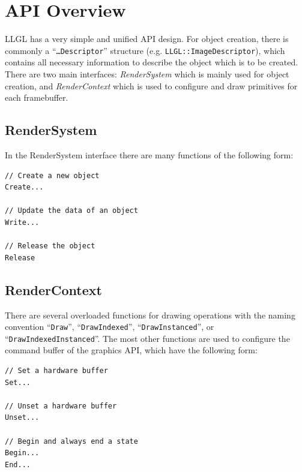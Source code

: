 \documentclass{article}
\begin{document}

\newpage

\section*{API Overview}

LLGL has a very simple and unified API design.
For object creation, there is commonly a ``\texttt{\dots Descriptor}'' structure (e.g. \texttt{LLGL::ImageDescriptor}),
which contains all necessary information to describe the object which is to be created.
There are two main interfaces: \emph{RenderSystem} which is mainly used for object creation,
and \emph{RenderContext} which is used to configure and draw primitives for each framebuffer.

\subsection*{RenderSystem}

In the RenderSystem interface there are many functions of the following form:
\begin{lstlisting}
// Create a new object
Create...

// Update the data of an object
Write...

// Release the object
Release
\end{lstlisting}

\subsection*{RenderContext}

There are several overloaded functions for drawing operations with the naming convention
``\texttt{Draw}'', ``\texttt{DrawIndexed}'', ``\texttt{DrawInstanced}'', or ``\texttt{DrawIndexedInstanced}''.
The most other functions are used to configure the command buffer of the graphics API, which have the following form:
\begin{lstlisting}
// Set a hardware buffer
Set...

// Unset a hardware buffer
Unset...

// Begin and always end a state
Begin...
End...
\end{lstlisting}


\end{document}
